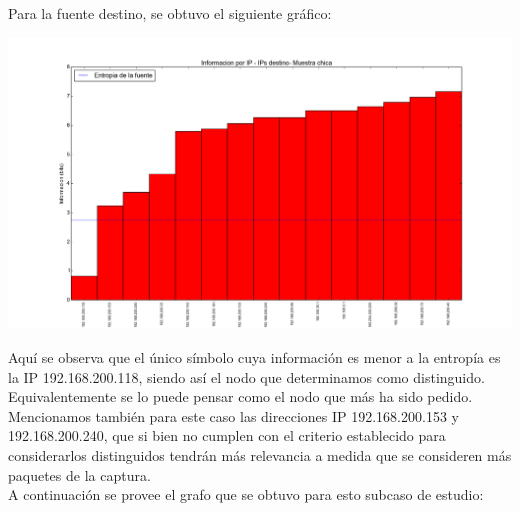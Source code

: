\indent Para la fuente destino, se obtuvo el siguiente gráfico:

\begin{center}
\includegraphics[scale=0.5,clip=true,trim=100 0 0 0]{graphics/laburo_chica_dst.png}
\end{center}

\indent Aquí se observa que el único símbolo cuya información es menor a la entropía es la IP 192.168.200.118, siendo así el nodo que determinamos como distinguido. Equivalentemente se lo puede pensar como el nodo que más ha sido pedido.\\
\indent Mencionamos también para este caso las direcciones IP 192.168.200.153 y 192.168.200.240, que si bien no cumplen con el criterio establecido para considerarlos distinguidos tendrán más relevancia a medida que se consideren más paquetes de la captura.\\

\indent A continuación se provee el grafo que se obtuvo para esto subcaso de estudio:\\

